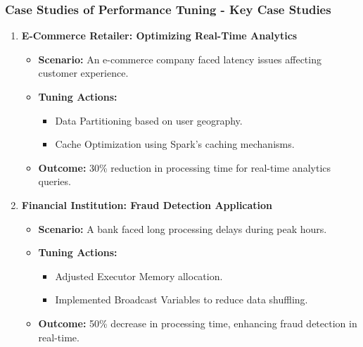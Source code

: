 \documentclass[aspectratio=169]{beamer}
\begin{document}
\begin{frame}[fragile]
    \frametitle{Case Studies of Performance Tuning - Key Case Studies}
    \begin{enumerate}
        \item \textbf{E-Commerce Retailer: Optimizing Real-Time Analytics}
            \begin{itemize}
                \item \textbf{Scenario:} An e-commerce company faced latency issues affecting customer experience.
                \item \textbf{Tuning Actions:}
                    \begin{itemize}
                        \item Data Partitioning based on user geography.
                        \item Cache Optimization using Spark’s caching mechanisms.
                    \end{itemize}
                \item \textbf{Outcome:} 30\% reduction in processing time for real-time analytics queries.
            \end{itemize}
            
        \item \textbf{Financial Institution: Fraud Detection Application}
            \begin{itemize}
                \item \textbf{Scenario:} A bank faced long processing delays during peak hours.
                \item \textbf{Tuning Actions:}
                    \begin{itemize}
                        \item Adjusted Executor Memory allocation.
                        \item Implemented Broadcast Variables to reduce data shuffling.
                    \end{itemize}
                \item \textbf{Outcome:} 50\% decrease in processing time, enhancing fraud detection in real-time.
            \end{itemize}
    \end{enumerate}
\end{frame}
\end{document}
